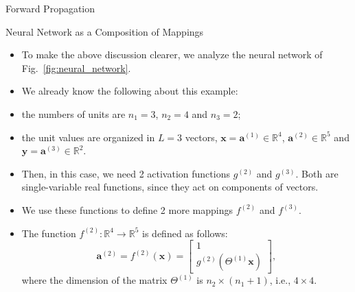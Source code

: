 \documentclass[8pt,american]{beamer}
\begin{document}
\begin{frame}{Forward Propagation}

\begin{block}{Neural Network as a Composition of Mappings}
\begin{itemize}
\justifying
\item To make the above discussion clearer, we analyze the neural network of
  Fig.~\ref{fig:neural_network}.
\item We already know the following about this example:
\item the numbers of units are $n_{1}=3$, $n_{2}=4$ and $n_{3}=2$;
\item the unit values are organized in $L=3$ vectors,
  $\mathbf{x}=\mathbf{a}^{\left(1\right)}\in\mathbb{R}^{4}$,
  $\mathbf{a}^{\left(2\right)}\in\mathbb{R}^{5}$ and
  $\mathbf{y}=\mathbf{a}^{\left(3\right)}\in\mathbb{R}^{2}$.
\item Then, in this case, we need 2 activation functions $g^{\left(2\right)}$ and
  $g^{\left(3\right)}$. Both are single-variable real functions, since they act
  on components of vectors.
\item We use these functions to define 2 more mappings $f^{\left(2\right)}$ and
  $f^{\left(3\right)}$.
\item The function $f^{\left(2\right)}:\mathbb{R}^{4}\rightarrow\mathbb{R}^{5}$
  is defined as follows:
  \begin{equation}
  \mathbf{a}^{\left(2\right)}=f^{\left(2\right)}\left(\mathbf{x}\right)=\begin{bmatrix}1\\
  g^{\left(2\right)}\left(\Theta^{\left(1\right)}\mathbf{x}\right)
  \end{bmatrix},
  \label{eq:mapping_f2}
  \end{equation}
  where the dimension of the matrix $\Theta^{\left(1\right)}$ is
  $n_{2}\times\left(n_{1}+1\right)$, i.e., $4\times4$.
\end{itemize}
\end{block}

\end{frame}
\end{document}
